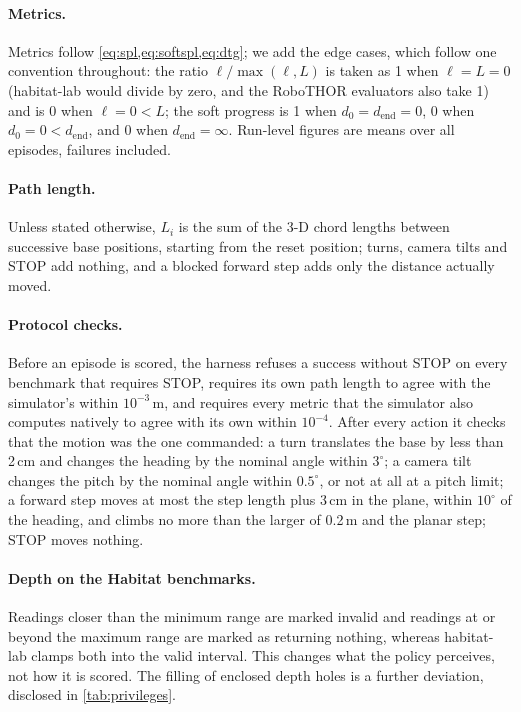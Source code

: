 \documentclass[10pt]{article}
\begin{document}
\paragraph{Metrics.} Metrics follow \cref{eq:spl,eq:softspl,eq:dtg}; we add the edge cases, which follow one convention throughout: the ratio $\ell/\max(\ell,L)$ is taken as 1 when $\ell = L = 0$ (habitat-lab would divide by zero, and the RoboTHOR evaluators also take 1) and is 0 when $\ell = 0 < L$; the soft progress is 1 when $d_0 = d_{\mathrm{end}} = 0$, 0 when $d_0 = 0 < d_{\mathrm{end}}$, and 0 when $d_{\mathrm{end}} = \infty$. Run-level figures are means over all episodes, failures included.

\paragraph{Path length.} Unless stated otherwise, $L_i$ is the sum of the 3-D chord lengths between successive base positions, starting from the reset position; turns, camera tilts and STOP add nothing, and a blocked forward step adds only the distance actually moved.

\paragraph{Protocol checks.} Before an episode is scored, the harness refuses a success without STOP on every benchmark that requires STOP, requires its own path length to agree with the simulator's within $10^{-3}$\,m, and requires every metric that the simulator also computes natively to agree with its own within $10^{-4}$. After every action it checks that the motion was the one commanded: a turn translates the base by less than 2\,cm and changes the heading by the nominal angle within $3^\circ$; a camera tilt changes the pitch by the nominal angle within $0.5^\circ$, or not at all at a pitch limit; a forward step moves at most the step length plus 3\,cm in the plane, within $10^\circ$ of the heading, and climbs no more than the larger of 0.2\,m and the planar step; STOP moves nothing.

\paragraph{Depth on the Habitat benchmarks.} Readings closer than the minimum range are marked invalid and readings at or beyond the maximum range are marked as returning nothing, whereas habitat-lab clamps both into the valid interval. This changes what the policy perceives, not how it is scored. The filling of enclosed depth holes is a further deviation, disclosed in \cref{tab:privileges}.
\end{document}
